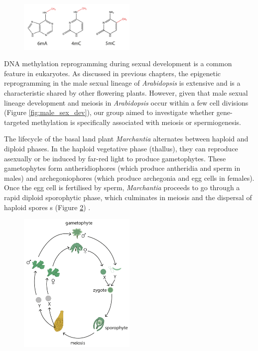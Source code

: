 \begin{figure}[htbp!] 
\centering    
    \includegraphics[width=0.5\textwidth]{Chapter3/Figs/Intro/base_mods.pdf}
\caption{}
\label{fig:base_mods}
\captionsetup{font=small}
    \caption*{}
\end{figure}

DNA methylation reprogramming during sexual development is a common feature in eukaryotes. As discussed in previous chapters, the epigenetic reprogramming in the male sexual lineage of \textit{Arabidopsis} is extensive and is a characteristic shared by other flowering plants. However, given that male sexual lineage development and meiosis in \textit{Arabidopsis} occur within a few cell divisions (Figure \ref{fig:male_sex_dev}), our group aimed to investigate whether gene-targeted methylation is specifically associated with meiosis or spermiogenesis.

The lifecycle of the basal land plant \textit{Marchantia} alternates between haploid and diploid phases. In the haploid vegetative phase (thallus), they can reproduce asexually or be induced by far-red light to produce gametophytes. These gametophytes form antheridiophores (which produce antheridia and sperm in males) and archegoniophores (which produce archegonia and egg cells in females). Once the egg cell is fertilised by sperm, \textit{Marchantia} proceeds to go through a rapid diploid sporophytic phase, which culminates in meiosis and the dispersal of haploid spores s (Figure \ref{fig:Mp_lifecycle}) \citep{RN143}.

\begin{figure}[htbp!] 
\centering    
    \includegraphics[width=0.5\textwidth]{Chapter3/Figs/Intro/Marchantia_lifecycle.pdf}
\caption{}
\label{fig:Mp_lifecycle}
\captionsetup{font=small}
    \caption*{}
\end{figure}

